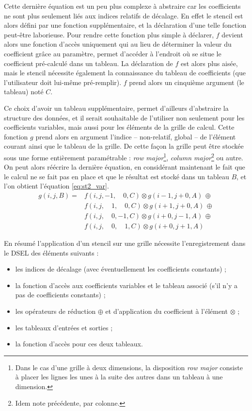 Cette dernière équation est un peu plus complexe à abstraire car les coefficients ne sont plus seulement liés aux indices relatifs de décalage. En effet le stencil est alors défini par une fonction supplémentaire, et la déclaration d'une telle fonction peut-être laborieuse. Pour rendre cette fonction plus simple à déclarer, $f$ devient alors une fonction d'accès uniquement qui au lieu de déterminer la valeur du coefficient grâce au paramètre, permet d'accéder à l'endroit où se situe le coefficient pré-calculé dans un tableau. La déclaration de $f$ est alors plus aisée, mais le stencil nécessite également la connaissance du tableau de coefficients (que l'utilisateur doit lui-même pré-remplir). $f$ prend alors un cinquième argument (le tableau) noté $C$.

Ce choix d'avoir un tableau supplémentaire, permet d'ailleurs d'abstraire la structure des données, et il serait souhaitable de l'utiliser non seulement pour les coefficients variables, mais aussi pour les éléments de la grille de calcul. Cette fonction $g$ prend alors en argument l'indice -- non-relatif, global -- de l'élément courant ainsi que le tableau de la grille. De cette façon la grille peut être stockée sous une forme entièrement paramétrable : \emph{row major}\footnote{Dans le cas d'une grille à deux dimensions, la disposition \emph{row major} consiste à placer les lignes les unes à la suite des autres dans un tableau à une dimension.}, \emph{column major}\footnote{Idem note précédente, par colonne.} ou autre. On peut alors réécrire la dernière équation, en considérant maintenant le fait que le calcul ne se fait pas en place et que le résultat est stocké dans un tableau $B$, et l'on obtient l'équation \ref{eq:st2_var}.
\begin{equation}
\label{eq:st2_var}
\begin{aligned}
g(i,j,B) = & f(i, j, -1, \quad 0, C) \otimes g(i-1, j+0, A) \, \oplus \\
           & f(i, j, \quad 1, \quad 0, C) \otimes g(i+1,j+0, A) \, \oplus \\
           & f(i, j, \quad 0, -1, C) \otimes g(i+0,j-1, A) \, \oplus \\ 
           & f(i, j, \quad 0, \quad 1, C) \otimes g(i+0,j+1, A)
\end{aligned}
\end{equation}

En résumé l'application d'un stencil sur une grille nécessite l'enregistrement dans le DSEL des éléments suivants : 
\begin{itemize}
\item les indices de décalage (avec éventuellement les coefficients constants) ;
\item la fonction d'accès aux coefficients variables et le tableau associé (s'il n'y a pas de coefficients constants) ;
\item les opérateurs de réduction $\oplus$ et d'application du coefficient à l'élément $\otimes$ ;
\item les tableaux d'entrées et sorties ;
\item la fonction d'accès pour ces deux tableaux.
\end{itemize}

